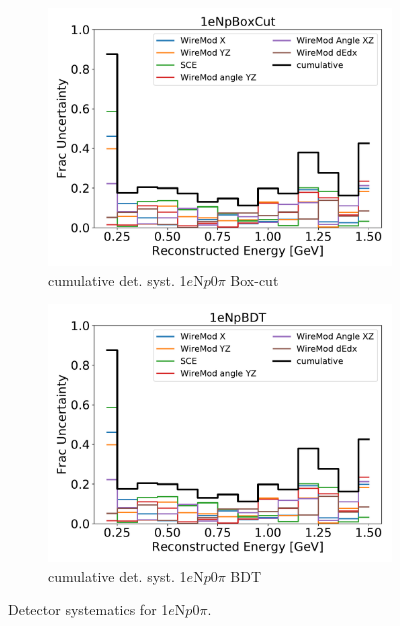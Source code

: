 \documentclass[a4paper]{article}
\newcommand{\npsel}{1$e$N$p$0$\pi$\xspace}
\begin{document}
\begin{figure}[H] 
\begin{center}
    \begin{subfigure}[b]{0.4\textwidth}
    \centering
    \includegraphics[width=1.00\textwidth]{detsys/cumulative/_cumulative_detsys_03312020_1eNpBoxCut_nue.pdf}
    \caption{\label{fig:detsys:cumulative:1eNp:box} cumulative det. syst. \npsel Box-cut}
    \end{subfigure}
    \begin{subfigure}[b]{0.4\textwidth}
    \centering
    \includegraphics[width=1.00\textwidth]{detsys/cumulative/_cumulative_detsys_03312020_1eNpBDT_nue.pdf}
    \caption{\label{fig:detsys:cumulative:1eNp:box} cumulative det. syst. \npsel BDT}
    \end{subfigure}
\caption{\label{fig:detsys:cumulative:1eNp}Detector systematics for \npsel.}
\end{center}
\end{figure}
\end{document}
